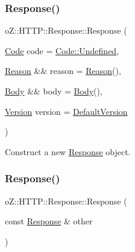 \subsubsection{\texorpdfstring{Response()}{Response()}\hspace{0.1cm}{\footnotesize\ttfamily [1/3]}}
{\footnotesize\ttfamily o\+Z\+::\+H\+T\+T\+P\+::\+Response\+::\+Response (\begin{DoxyParamCaption}\item[{\mbox{\hyperlink{namespaceo_z_1_1_h_t_t_p_acd43703151305f79b1e2f42e98ee8199}{Code}}}]{code = {\ttfamily \mbox{\hyperlink{namespaceo_z_1_1_h_t_t_p_acd43703151305f79b1e2f42e98ee8199aec0fc0100c4fc1ce4eea230c3dc10360}{Code\+::\+Undefined}}},  }\item[{\mbox{\hyperlink{namespaceo_z_1_1_h_t_t_p_afcd8b91e5e8a7b6df0a7b3b298ec3965}{Reason}} \&\&}]{reason = {\ttfamily \mbox{\hyperlink{namespaceo_z_1_1_h_t_t_p_afcd8b91e5e8a7b6df0a7b3b298ec3965}{Reason}}()},  }\item[{\mbox{\hyperlink{namespaceo_z_1_1_h_t_t_p_a270c38b9f9b6228ce430fda6d5b150d6}{Body}} \&\&}]{body = {\ttfamily \mbox{\hyperlink{namespaceo_z_1_1_h_t_t_p_a270c38b9f9b6228ce430fda6d5b150d6}{Body}}()},  }\item[{\mbox{\hyperlink{structo_z_1_1_h_t_t_p_1_1_version}{Version}}}]{version = {\ttfamily \mbox{\hyperlink{namespaceo_z_1_1_h_t_t_p_af1d13b042d8595fb3196ce91c5c4955d}{Default\+Version}}} }\end{DoxyParamCaption})\hspace{0.3cm}{\ttfamily [inline]}}



Construct a new \mbox{\hyperlink{classo_z_1_1_h_t_t_p_1_1_response}{Response}} object. 

\mbox{\label{classo_z_1_1_h_t_t_p_1_1_response_a917512ce455c189e139f861d68268997}} 
\subsubsection{\texorpdfstring{Response()}{Response()}\hspace{0.1cm}{\footnotesize\ttfamily [2/3]}}
{\footnotesize\ttfamily o\+Z\+::\+H\+T\+T\+P\+::\+Response\+::\+Response (\begin{DoxyParamCaption}\item[{const \mbox{\hyperlink{classo_z_1_1_h_t_t_p_1_1_response}{Response}} \&}]{other }\end{DoxyParamCaption})\hspace{0.3cm}{\ttfamily [default]}}



